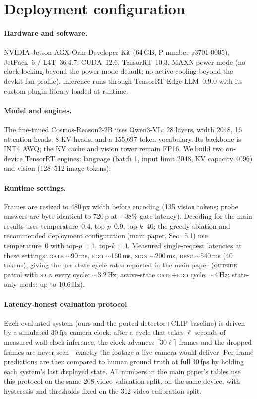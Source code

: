 \documentclass[10pt,twocolumn,letterpaper]{article}
\begin{document}
\section{Deployment configuration}
\label{supp:deploy}

\paragraph{Hardware and software.}  NVIDIA Jetson AGX Orin Developer Kit (64\,GB, P-number p3701-0005), JetPack~6 / L4T~36.4.7, CUDA~12.6, TensorRT~10.3, MAXN power mode (no clock locking beyond the power-mode default; no active cooling beyond the devkit fan profile).  Inference runs through TensorRT-Edge-LLM~0.9.0 with its custom plugin library loaded at runtime.

\paragraph{Model and engines.}  The fine-tuned Cosmos-Reason2-2B uses Qwen3-VL: 28 layers, width 2048, 16 attention heads, 8 KV heads, and a 155{,}697-token vocabulary.  Its backbone is INT4 AWQ; the KV cache and vision tower remain FP16.  We build two on-device TensorRT engines: language (batch 1, input limit 2048, KV capacity 4096) and vision (128--512 image tokens).

\paragraph{Runtime settings.}  Frames are resized to 480\,px width before encoding (135 vision tokens; probe answers are byte-identical to 720\,p at $-$38\% gate latency).  Decoding for the main results uses temperature~0.4, top-$p$~0.9, top-$k$~40; the greedy ablation and recommended deployment configuration (main paper, Sec.~5.1) use temperature~0 with top-$p{=}1$, top-$k{=}1$.  Measured single-request latencies at these settings: \textsc{gate} $\sim$90\,ms, \textsc{ego} $\sim$160\,ms, \textsc{sign} $\sim$200\,ms, \textsc{desc} $\sim$540\,ms (40 tokens), giving the per-state cycle rates reported in the main paper (\textsc{outside} patrol with \textsc{sign} every cycle: $\sim$3.2\,Hz; active-state \textsc{gate}+\textsc{ego} cycle: $\sim$4\,Hz; state-only mode: up to 10.6\,Hz).

\paragraph{Latency-honest evaluation protocol.}  Each evaluated system (ours and the ported detector+CLIP baseline) is driven by a simulated 30\,fps camera clock: after a cycle that takes $\ell$ seconds of measured wall-clock inference, the clock advances $\lceil 30\ell \rceil$ frames and the dropped frames are never seen---exactly the footage a live camera would deliver.  Per-frame predictions are then compared to human ground truth at full 30\,fps by holding each system's last displayed state.  All numbers in the main paper's tables use this protocol on the same 208-video validation split, on the same device, with hysteresis and thresholds fixed on the 312-video calibration split.
\end{document}
